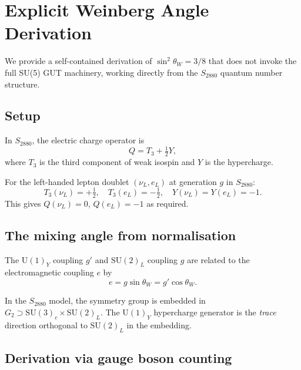 \section{Explicit Weinberg Angle Derivation}
\label{app:weinberg}

We provide a self-contained derivation of $\sin^2\!\theta_W = 3/8$ that does not invoke
the full SU(5) GUT machinery, working directly from the $S_{2880}$ quantum number structure.

\subsection{Setup}

In $S_{2880}$, the electric charge operator is
\begin{equation}
  Q = T_3 + \tfrac{1}{2} Y ,
\label{eq:charge_def}
\end{equation}
where $T_3$ is the third component of weak isospin and $Y$ is the hypercharge.

For the left-handed lepton doublet $(\nu_L, e_L)$ at generation $g$ in $S_{2880}$:
\begin{equation}
  T_3(\nu_L) = +\tfrac{1}{2}, \quad T_3(e_L) = -\tfrac{1}{2}, \quad Y(\nu_L) = Y(e_L) = -1 .
\end{equation}
This gives $Q(\nu_L) = 0$, $Q(e_L) = -1$ as required.

\subsection{The mixing angle from normalisation}

The $\mathrm{U}(1)_Y$ coupling $g'$ and $\mathrm{SU}(2)_L$ coupling $g$ are related to
the electromagnetic coupling $e$ by
\begin{equation}
  e = g \sin\theta_W = g' \cos\theta_W .
\end{equation}

In the $S_{2880}$ model, the symmetry group is embedded in $G_2 \supset \mathrm{SU}(3)_c
\times \mathrm{SU}(2)_L$.  The $\mathrm{U}(1)_Y$ hypercharge generator is the \emph{trace}
direction orthogonal to $\mathrm{SU}(2)_L$ in the embedding.

\subsection{Derivation via gauge boson counting}

